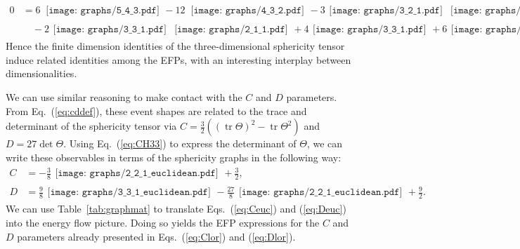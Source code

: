 \documentclass[aps,prd,floatfix,preprintnumbers,twocolumn,groupedaddress,nofootinbib,longbibliography,10pt]{revtex4-1}
\DeclareMathOperator{\tr}{tr}
\DeclareRobustCommand{\Tab}[1]{Table~\ref{#1}}
\DeclareRobustCommand{\Eq}[1]{Eq.~(\ref{#1})}
\DeclareRobustCommand{\Eqs}[2]{Eqs.~(\ref{#1}) and (\ref{#2})}
\begin{document}
 \begin{align}
0 & =6\,  \begin{gathered}\texttt{[image: graphs/5\_4\_3.pdf]}\end{gathered}
- 12\, \begin{gathered}\texttt{[image: graphs/4\_3\_2.pdf]}\end{gathered}
-3  \begin{gathered}\texttt{[image: graphs/3\_2\_1.pdf]}\end{gathered} \begin{gathered}\texttt{[image: graphs/2\_2\_1.pdf]}\end{gathered}
\nonumber\\ &\quad-2 \begin{gathered}\texttt{[image: graphs/3\_3\_1.pdf]}\end{gathered}\begin{gathered}\texttt{[image: graphs/2\_1\_1.pdf]}\end{gathered}
+ 4 \begin{gathered}\texttt{[image: graphs/3\_3\_1.pdf]}\end{gathered}
+ 6  \begin{gathered}\texttt{[image: graphs/2\_2\_1.pdf]}\end{gathered} \begin{gathered}\texttt{[image: graphs/2\_1\_1.pdf]}\end{gathered}
.\label{eq:efpid2}
\end{align}
%
Hence the finite dimension identities of the three-dimensional sphericity tensor induce related identities among the EFPs, with an interesting interplay between dimensionalities.


We can use similar reasoning to make contact with the $C$ and $D$ parameters.
%
From \Eq{eq:cddef}, these event shapes are related to the trace and determinant of the sphericity tensor via $C = \frac32((\tr\Theta)^2 - \tr\Theta^2)$ and $D = 27 \det \Theta$.
%
Using \Eq{eq:CH33} to express the determinant of $\Theta$, we can write these observables in terms of the sphericity graphs in the following way:
%
\begin{align}\label{eq:Ceuc}
C & = - \frac38\begin{gathered}\texttt{[image: graphs/2\_2\_1\_euclidean.pdf]}\end{gathered} + \frac32,\\
D & = \frac{9}{8}\begin{gathered}\texttt{[image: graphs/3\_3\_1\_euclidean.pdf]}\end{gathered} - \frac{27}{8}\begin{gathered}\texttt{[image: graphs/2\_2\_1\_euclidean.pdf]}\end{gathered} + \frac{9}{2}.
\label{eq:Deuc}
\end{align}
%
We can use \Tab{tab:graphmat} to translate \Eqs{eq:Ceuc}{eq:Deuc} into the energy flow picture.
%
Doing so yields the EFP expressions for the $C$ and $D$ parameters already presented in \Eqs{eq:Clor}{eq:Dlor}.



\end{document}
